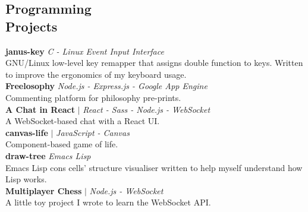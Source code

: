 \documentclass[margin,line]{resume}
\begin{document}
\begin{resume}



    \section{\mysidestyle Programming\\Projects}

    \textbf{janus-key} \> \href{https://github.com/pietroiusti/janus-key}{\faGithub} \> \textit{C - Linux Event Input Interface}\\GNU/Linux low-level key remapper that assigns double function to keys. Written to improve the ergonomics of my keyboard
    usage.\vspace{1mm}\\%
    \textbf{Freelosophy} \> \href{https://freelosophy.github.io/}{\faLink} \> \textit{Node.js - Express.js - Google App Engine}\\Commenting platform for philosophy pre-prints.\vspace{1mm}\\%
    \textbf{A Chat in React} \> \href{https://chatinreact.herokuapp.com/}{\faLink} $\vert$ \href{https://github.com/pietroiusti/react-chat}{\faGithub} \> \textit{React - Sass - Node.js - WebSocket}\\A WebSocket-based chat with a React UI.\vspace{1mm}\\%
    \textbf{canvas-life} \> \href{https://pietroiusti.github.io/canvas_life/life.html}{\faLink} $\vert$ \href{https://github.com/pietroiusti/canvas_life}{\faGithub} \> \textit{JavaScript - Canvas}\\Component-based game of life.\vspace{1mm}\\%
    \textbf{draw-tree} \> \href{https://github.com/pietroiusti/draw-tree}{\faGithub} \> \textit{Emacs Lisp}\\Emacs Lisp cons cells' structure visualiser written to help myself understand how Lisp works.\vspace{1mm}\\%
    \textbf{Multiplayer Chess} \> \href{https://multi-player-chess.herokuapp.com/}{\faLink} $\vert$ \href{https://github.com/pietroiusti/chess}{\faGithub} \> \textit{Node.js - WebSocket}\\A little toy project I wrote to learn the WebSocket API.



\end{resume}
\end{document}
